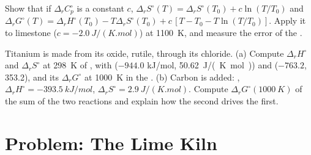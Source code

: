 \begin{exercise}[$\star\star\star$]\label{exo:b2:reaction-free-energy:11}
Show that if $\Delta_r C^\circ_p$ is a constant $c$,
$\Delta_r S^\circ(T) = \Delta_r S^\circ(T_0) + c\ln(T/T_0)$ and
$\Delta_r G^\circ(T) = \Delta_r H^\circ(T_0) - T\Delta_r S^\circ(T_0) +
c\,[T - T_0 - T\ln(T/T_0)]$. Apply it to limestone ($c =
\qty{-2.0}{J/(K.mol)}$) at \qty{1100}{K}, and measure the error of the
.
\end{exercise}

\begin{exercise}[$\star\star\star$]\label{exo:b2:reaction-free-energy:12}
Titanium is made from its oxide, rutile, through its chloride. (a) Compute
$\Delta_r H^\circ$ and $\Delta_r S^\circ$ at \qty{298}{K} of , with  ($-944.0$ \unit{kJ/mol},
\qty{50.62}{J/(K.mol)}) and  ($-763.2$, 353.2), and its
$\Delta_r G^\circ$ at \qty{1000}{K} in the .
(b) Carbon is added: , $\Delta_r H^\circ =
\qty{-393.5}{kJ/mol}$, $\Delta_r S^\circ = \qty{+2.9}{J/(K.mol)}$. Compute
$\Delta_r G^\circ(\qty{1000}{K})$ of the sum of the two reactions and
explain how the second drives the first.
\end{exercise}

\section{Problem: The Lime Kiln}

